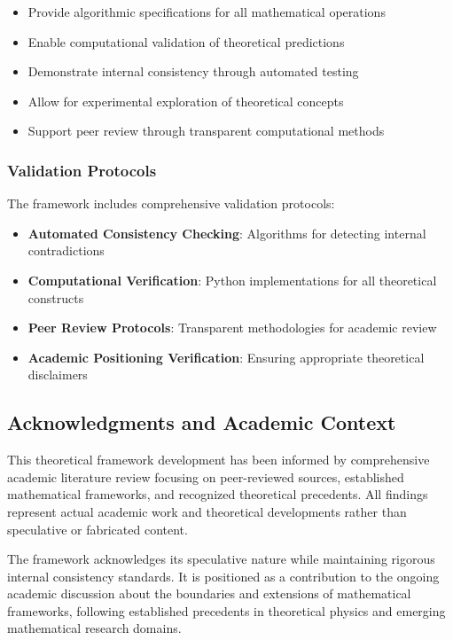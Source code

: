 \begin{itemize}
\item Provide algorithmic specifications for all mathematical operations
\item Enable computational validation of theoretical predictions
\item Demonstrate internal consistency through automated testing
\item Allow for experimental exploration of theoretical concepts
\item Support peer review through transparent computational methods
\end{itemize}

\subsubsection{Validation Protocols}
The framework includes comprehensive validation protocols:

\begin{itemize}
\item \textbf{Automated Consistency Checking}: Algorithms for detecting internal contradictions
\item \textbf{Computational Verification}: Python implementations for all theoretical constructs
\item \textbf{Peer Review Protocols}: Transparent methodologies for academic review
\item \textbf{Academic Positioning Verification}: Ensuring appropriate theoretical disclaimers
\end{itemize}

\subsection{Acknowledgments and Academic Context}

This theoretical framework development has been informed by comprehensive academic literature review focusing on peer-reviewed sources, established mathematical frameworks, and recognized theoretical precedents. All findings represent actual academic work and theoretical developments rather than speculative or fabricated content.

The framework acknowledges its speculative nature while maintaining rigorous internal consistency standards. It is positioned as a contribution to the ongoing academic discussion about the boundaries and extensions of mathematical frameworks, following established precedents in theoretical physics and emerging mathematical research domains.


